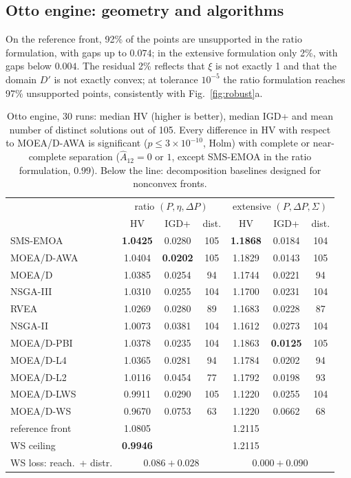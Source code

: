 \documentclass[journal]{IEEEtran}
\theoremstyle{remark}
\begin{document}
\subsection{Otto engine: geometry and algorithms}

On the reference front, 92\% of the points are unsupported in the ratio formulation, with gaps up to
$0.074$; in the extensive formulation only 2\%, with gaps below $0.004$. The residual 2\% reflects that
$\xi$ is not exactly 1 and that the domain $D'$ is not exactly convex; at tolerance $10^{-5}$ the ratio
formulation reaches 97\% unsupported points, consistently with Fig.~\ref{fig:robust}a.

\begin{table}[t]
\caption{Otto engine, 30 runs: median HV (higher is better), median IGD+ and mean number of distinct
solutions out of 105. Every difference in HV with respect to MOEA/D-AWA is significant
($p \le 3\times10^{-10}$, Holm) with complete or near-complete separation ($\hat A_{12} = 0$ or $1$,
except SMS-EMOA in the ratio formulation, $0.99$). Below the line: decomposition baselines designed for
nonconvex fronts.}
\label{tab:otto}
\centering
\footnotesize
\setlength{\tabcolsep}{3.2pt}
\begin{tabular}{lcccccc}
\toprule
 & \multicolumn{3}{c}{ratio $(P,\eta,\Delta P)$} & \multicolumn{3}{c}{extensive $(P,\Delta P,\Sigma)$}\\
 & HV & IGD+ & dist. & HV & IGD+ & dist.\\
\midrule
SMS-EMOA & \textbf{1.0425} & 0.0280 & 105 & \textbf{1.1868} & 0.0184 & 104\\
MOEA/D-AWA & 1.0404 & \textbf{0.0202} & 105 & 1.1829 & 0.0143 & 105\\
MOEA/D & 1.0385 & 0.0254 & 94 & 1.1744 & 0.0221 & 94\\
NSGA-III & 1.0310 & 0.0255 & 104 & 1.1700 & 0.0231 & 104\\
RVEA & 1.0269 & 0.0280 & 89 & 1.1683 & 0.0228 & 87\\
NSGA-II & 1.0073 & 0.0381 & 104 & 1.1612 & 0.0273 & 104\\
\midrule
MOEA/D-PBI & 1.0378 & 0.0235 & 104 & 1.1863 & \textbf{0.0125} & 105\\
MOEA/D-L4 & 1.0365 & 0.0281 & 94 & 1.1784 & 0.0202 & 94\\
MOEA/D-L2 & 1.0116 & 0.0454 & 77 & 1.1792 & 0.0198 & 93\\
MOEA/D-LWS & 0.9911 & 0.0290 & 105 & 1.1220 & 0.0255 & 104\\
MOEA/D-WS & 0.9670 & 0.0753 & 63 & 1.1220 & 0.0662 & 68\\
\midrule
reference front & 1.0805 & & & 1.2115 & &\\
WS ceiling & \textbf{0.9946} & & & 1.2115 & &\\
WS loss: reach.\ + distr. & \multicolumn{3}{c}{$\mathbf{0.086} + 0.028$} & \multicolumn{3}{c}{$0.000 + \mathbf{0.090}$}\\
\bottomrule
\end{tabular}
\end{table}
\end{document}
